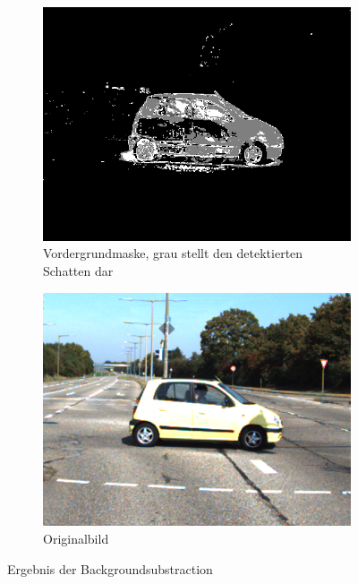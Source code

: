 \documentclass[conference]{IEEEtran}
\begin{document}
\begin{figure}
\centering
\begin{subfigure}[t]{.23\textwidth}
\centering
  \includegraphics[width=1\linewidth]{trainds01_foregroundmask}
  \caption{Vordergrundmaske, grau stellt den detektierten Schatten dar}
  \label{fig:sub1}
\end{subfigure}
\begin{subfigure}[t]{.23\textwidth}
\centering
  \includegraphics[width=1\linewidth]{trainds01_original}
  \caption{Originalbild}
  \label{fig:sub2}
\end{subfigure}
\caption{Ergebnis der Backgroundsubstraction}
\label{fig:test}
\end{figure}
\end{document}
